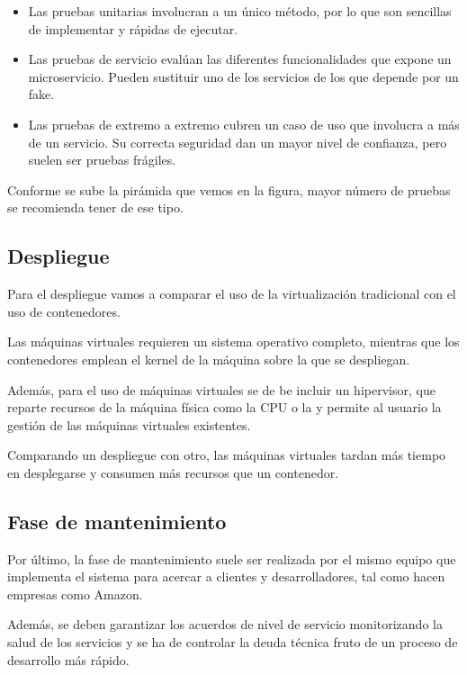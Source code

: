 \documentclass[11pt,a4paper]{article}
\begin{document}
\begin{itemize}

\item Las pruebas unitarias involucran a un único método, por lo que son sencillas de implementar y rápidas de ejecutar.

\item Las pruebas de servicio evalúan las diferentes funcionalidades que expone un microservicio. Pueden sustituir uno de los servicios de los que depende por un fake.

\item Las pruebas de extremo a extremo cubren un caso de uso que involucra a más de un servicio. Su correcta seguridad dan un mayor nivel de confianza, pero suelen ser pruebas frágiles.

\end{itemize}

Conforme se sube la pirámida que vemos en la figura, mayor número de pruebas se recomienda tener de ese tipo.

\subsection{Despliegue}

Para el despliegue vamos a comparar el uso de la virtualización tradicional con el uso de contenedores.

Las máquinas virtuales requieren un sistema operativo completo, mientras que los contenedores emplean el kernel de la máquina sobre la que se despliegan.

Además, para el uso de máquinas virtuales se de be incluir un hipervisor, que reparte recursos de la máquina física como la CPU o la y permite al usuario la gestión de las máquinas virtuales existentes.

Comparando un despliegue con otro, las máquinas virtuales tardan más tiempo en desplegarse y consumen más recursos que un contenedor.

\subsection{Fase de mantenimiento}

Por último, la fase de mantenimiento suele ser realizada por el mismo equipo que implementa el sistema para acercar a clientes y desarrolladores, tal como hacen empresas como Amazon.

Además, se deben garantizar los acuerdos de nivel de servicio monitorizando la salud de los servicios
y se ha de controlar la deuda técnica fruto de un proceso de desarrollo más rápido.
\end{document}
